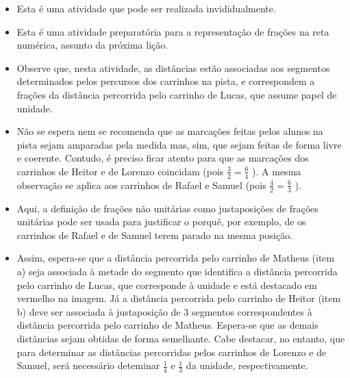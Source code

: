 \documentclass[oneside]{book}
\begin{document}
\begin{multicols}{2}
  \begin{itemize} %
    \item       Esta é uma atividade que pode ser realizada invididualmente.
    \item       Esta é uma atividade preparatória para a representação de frações na reta numérica, assunto da próxima lição.
    \item       Observe que, nesta atividade, as distâncias estão associadas aos segmentos determinados pelos percursos dos carrinhos na pista, e correspondem a frações da distância percorrida pelo carrinho de Lucas, que assume papel de unidade.
    \item       Não se espera nem se recomenda que as marcações feitas pelos alunos na pista sejam amparadas pela medida mas, sim, que sejam feitas de forma livre e coerente. Contudo, é preciso ficar atento para que as marcações dos carrinhos de Heitor e de Lorenzo coincidam (pois       $\frac{3}{2} = \frac{6}{4}$      ). A mesma observação se aplica aos carrinhos de Rafael e Samuel (pois       $\frac{4}{2} = \frac{6}{3}$      ).
    \item       Aqui, a definição de frações não unitárias como justaposições de frações unitárias pode ser usada para justificar o porquê, por exemplo, de os carrinhos de Rafael e de Samuel terem parado na mesma posição.
    \item       Assim, espera-se que a distância percorrida pelo carrinho de Matheus (item a) seja associada à metade do segmento que identifica a distância percorrida pelo carrinho de Lucas, que corresponde à unidade e está destacado em vermelho na imagem. Já a distância percorrida pelo carrinho de Heitor (item b) deve ser associada à justaposição de       $3$       segmentos correspondentes à distância percorrida pelo carrinho de Matheus. Espera-se que as demais distâncias sejam obtidas de forma semelhante. Cabe destacar, no entanto, que para determinar as distâncias percorridas pelos carrinhos de Lorenzo e de Samuel, será necessário deteminar       $\frac{1}{4}$       e       $\frac{1}{3}$       da unidade, respectivamente.

\end{itemize}
\end{multicols}
\end{document}
